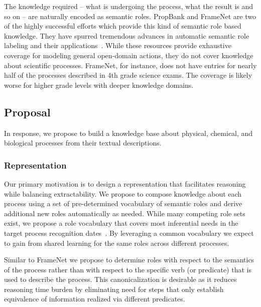 The knowledge required -- what is undergoing the process, what the result is and so on -- are naturally encoded as semantic roles.
PropBank and FrameNet are two of the highly successful efforts which provide this kind of semantic role based knowledge.
They have spurred tremendous advances in automatic semantic role labeling and their applications~\cite{}.
While these resources provide exhaustive coverage for modeling general open-domain actions,
they do not cover knowledge about scientific processes. 
FrameNet, for instance, does not have entries for nearly half of the processes described in 4th grade science exams. 
The coverage is likely worse for higher grade levels with deeper knowledge domains. 

\subsection{Proposal}

In response, we propose to build a knowledge base about physical, chemical, and biological processes from their textual descriptions. 

\subsubsection*{Representation}

Our primary motivation is to design a representation that facilitates reasoning while balancing extractability.
We propose to compose knowledge about each process using a set of pre-determined vocabulary of semantic roles and derive additional new roles automatically as needed.
While many competing role sets exist, we propose a role vocabulary that covers most inferential needs in the target process recognition dates~\cite{louvan2015:kcap}.
By leveraging a common vocabulary we expect to gain from shared learning for the same roles across different processes.

Similar to FrameNet we propose to determine roles with respect to the semantics of the process rather than with respect to the specific verb (or predicate) that is used to describe the process.
This canonicalization is desirable as it reduces reasoning time burden by eliminating need for steps that only establish equivalence of information realized via different predicates.

